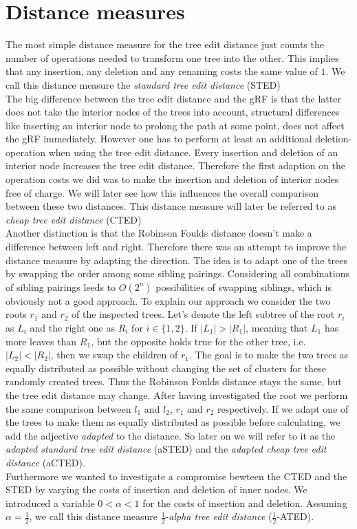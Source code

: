 \section{Distance measures}
The most simple distance measure for the tree edit distance just counts the number of operations needed to transform one tree into the other. This implies that any insertion, any deletion and any renaming costs the same value of $1$. We call this distance measure the \textit{standard tree edit distance} (STED)\\
The big difference between the tree edit distance and the gRF is that the latter does not take the interior nodes of the trees into account, structural differences like inserting an interior node to prolong the path at some point, does not affect the gRF immediately. However one has to perform at least an additional deletion-operation when using the tree edit distance. Every insertion and deletion of an interior node increases the tree edit distance. Therefore the first adaption on the operation costs we did was to make the insertion and deletion of interior nodes free of charge. We will later see how this influences the overall comparison between these two distances. This distance measure will later be referred to as \textit{cheap tree edit distance} (CTED)\\
Another distinction is that the Robinson Foulds distance doesn't make a difference between left and right. Therefore there was an attempt to improve the distance measure by adapting the direction. The idea is to adapt one of the trees by swapping the order among some sibling pairings. Considering all combinations of sibling pairings leeds to $O(2^n)$ possibilities of swapping siblings, which is obviously not a good approach. To explain our approach we consider the two roots $r_1$ and $r_2$ of the inspected trees.
Let's denote the left subtree of the root $r_i$ as $L_i$ and the right one as $R_i$ for $i \in \{1,2\}$. If $|L_1| > |R_1|$, meaning that $L_1$ has more leaves than $R_1$, but the opposite holds true for the other tree, i.e. $|L_2| < |R_2|$, then we swap the children of $r_1$. The goal is to make the two trees as equally distributed as possible without changing the set of clusters for these randomly created trees. Thus the Robinson Foulds distance stays the same, but the tree edit distance may change. After having investigated the root we perform the same comparison between $l_1$ and $l_2$, $r_1$ and $r_2$ respectively. If we adapt one of the trees to make them as equally distributed as possible before calculating, we add the adjective \textit{adapted} to the distance. So later on we will refer to it as the \textit{adapted standard tree edit distance} (aSTED) and the \textit{adapted cheap tree edit distance} (aCTED).\\
Furthermore we wanted to investigate a compromise bewteen the CTED and the STED by varying the costs of insertion and deletion of inner nodes. We introduced a variable $0 < \alpha < 1$ for the costs of insertion and deletion. Assuming $\alpha = \frac{1}{2}$,  we call this distance measure $\frac{1}{2}$-\textit{alpha tree edit distance} ($\frac{1}{2}$-ATED).

